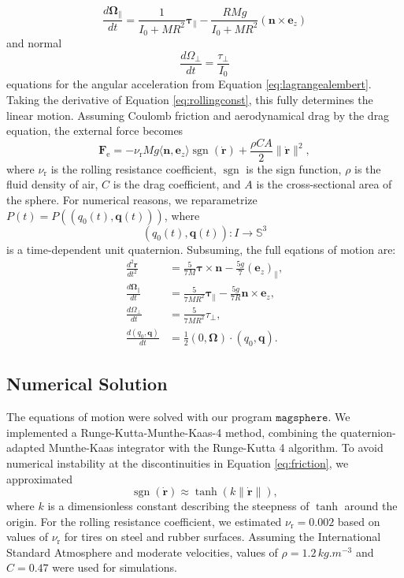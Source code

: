 \documentclass[12pt, letter paper]{article}
\DeclareMathOperator{\sgn}{sgn}
\begin{document}
\begin{equation}
    \label{eq:tangangularvel}
    \frac{d \bm{\Omega}_\|}{dt} = \frac{1}{I_0+MR^2} \bm{\tau}_\| - \frac{RMg}{I_0+MR^2}(\bm{n} \times \bm{e}_z) 
\end{equation}
and normal 
\begin{equation}
    \label{eq:normalangularvel}
    \frac{d \Omega_\perp}{dt} = \frac{\tau_\perp}{I_0}
\end{equation}
equations for the angular acceleration from Equation \ref{eq:lagrangealembert}. Taking the derivative of Equation \ref{eq:rollingconst}, this fully determines the linear motion. Assuming Coulomb friction and aerodynamical drag by the drag equation, the external force becomes \begin{equation}
    \label{eq:friction}
    \bm{F}_\text{e} = - \nu_\text{r} Mg \langle \bm{n},\bm{e}_z\rangle \sgn (\dot{\bm{r}}) + \frac{\rho C A}{2} \|\dot{\bm{r}}\|^2
    ,\end{equation} where $\nu_\text{r}$ is the rolling resistance coefficient, $\sgn$ is the sign function, $\rho$ is the fluid density of air, $C$ is the drag coefficient, and $A$ is the cross-sectional area of the sphere\cite{Coulomb, Hayakawa2005, Landau2002}. For numerical reasons, we reparametrize $P(t)=P((q_0(t),\bm{q}(t)))$, where \[
(q_0(t), \bm{q}(t)): I \to \mathbb{S}^3
\] is a time-dependent unit quaternion. Subsuming, the full eqations of motion are:
\begin{equation}
    \label{eq:eom}
    \begin{aligned}
        \frac{d^2 \bm{r}}{dt^2}&= \frac{5}{7M} \bm{\tau} \times \bm{n} - \frac{5g}{7} (\bm{e}_z)_\|, \\
        \frac{d\bm{\Omega}_\|}{dt} &= \frac{5}{7MR^2}\bm{\tau}_\| - \frac{5g}{7R} \bm{n} \times \bm{e}_z,\\
        \frac{d \Omega_\perp}{dt} &= \frac{5}{7MR^2} \tau_\perp, \\
        \frac{d(q_0,\bm{q})}{dt}&=\frac{1}{2}(0, \bm{\Omega}) \cdot (q_0, \bm{q}).
\end{aligned}
\end{equation}
\subsection{Numerical Solution}
The equations of motion were solved with our program $\mathtt{magsphere}$\cite{magsphere2026}. We implemented a Runge-Kutta-Munthe-Kaas-4 method, combining the quaternion-adapted Munthe-Kaas integrator with the Runge-Kutta 4 algorithm\cite{Butcher1996, MuntheKaas1998}. To avoid numerical instability at the discontinuities in Equation \ref{eq:friction}, we approximated \[
    \sgn(\dot{\bm{r}}) \approx \tanh(k \| \dot{\bm{r}}\|)
,\] where $k$ is a dimensionless constant describing the steepness of $\tanh$ around the origin. For the rolling resistance coefficient, we estimated $\nu_\text{r}=0.002$ based on values of $\nu_\text{r}$ for tires on steel and rubber surfaces\cite{Guba2023}.
Assuming the International Standard Atmosphere and moderate velocities, values of $\rho = 1.2 \, \unit{kg.m^{-3}}$ and $C=0.47$ were used for simulations\cite{iso2533, Baker1983}.
\end{document}
